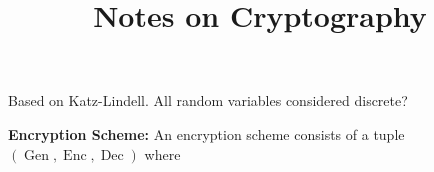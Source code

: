 \documentclass[twoside, a4paper, 10pt]{amsart}
\title[ ]{Notes on Cryptography}
\begin{document}
\maketitle
\raggedbottom


\newcommand{\cA}{\mathcal{A}}
\newcommand{\cB}{\mathcal{B}}
\newcommand{\cC}{\mathcal{C}}
\newcommand{\cD}{\mathcal{D}}
\newcommand{\cE}{\mathcal{E}}
\newcommand{\cF}{\mathcal{F}}
\newcommand{\cG}{\mathcal{G}}
\newcommand{\cH}{\mathcal{H}}
\newcommand{\cI}{\mathcal{I}}
\newcommand{\cJ}{\mathcal{J}}
\newcommand{\cK}{\mathcal{K}}
\newcommand{\cL}{\mathcal{L}}
\newcommand{\cM}{\mathcal{M}}
\newcommand{\cN}{\mathcal{N}}
\newcommand{\cO}{\mathcal{O}}
\newcommand{\cP}{\mathcal{P}}
\newcommand{\cQ}{\mathcal{Q}}
\newcommand{\cR}{\mathcal{R}}
\newcommand{\cS}{\mathcal{S}}
\newcommand{\cT}{\mathcal{T}}
\newcommand{\cU}{\mathcal{U}}
\newcommand{\cV}{\mathcal{V}}
\newcommand{\cW}{\mathcal{W}}
\newcommand{\cX}{\mathcal{X}}
\newcommand{\cY}{\mathcal{Y}}
\newcommand{\cZ}{\mathcal{Z}}
\newcommand{\bA}{\mathbb{A}}
\newcommand{\bB}{\mathbb{B}}
\newcommand{\bC}{\mathbb{C}}
\newcommand{\bD}{\mathbb{D}}
\newcommand{\bE}{\mathbb{E}}
\newcommand{\bF}{\mathbb{F}}
\newcommand{\bG}{\mathbb{G}}
\newcommand{\bH}{\mathbb{H}}
\newcommand{\bI}{\mathbb{I}}
\newcommand{\bJ}{\mathbb{J}}
\newcommand{\bK}{\mathbb{K}}
\newcommand{\bL}{\mathbb{L}}
\newcommand{\bM}{\mathbb{M}}
\newcommand{\bN}{\mathbb{N}}
\newcommand{\bO}{\mathbb{O}}
\newcommand{\bP}{\mathbb{P}}
\newcommand{\bQ}{\mathbb{Q}}
\newcommand{\bR}{\mathbb{R}}
\newcommand{\bS}{\mathbb{S}}
\newcommand{\bT}{\mathbb{T}}
\newcommand{\bU}{\mathbb{U}}
\newcommand{\bV}{\mathbb{V}}
\newcommand{\bW}{\mathbb{W}}
\newcommand{\bX}{\mathbb{X}}
\newcommand{\bY}{\mathbb{Y}}
\newcommand{\bZ}{\mathbb{Z}}


 

\theoremstyle{definition}
\newtheorem{mydef}[dummy]{Definition}
\newtheorem{prop}[dummy]{Proposition}
\newtheorem{corol}[dummy]{Corollary}
\newtheorem{thm}[dummy]{Theorem}
\newtheorem{lemma}[dummy]{Lemma}
\newtheorem{eg}[dummy]{Example}
\newtheorem{notation}[dummy]{Notation}
\newtheorem{remark}[dummy]{Remark}
\newtheorem{claim}[dummy]{Claim}
\newtheorem{Exercise}[dummy]{Exercise}
\newtheorem{question}[dummy]{Question}
\newtheorem{conjecture}[dummy]{Conjecture}


Based on Katz-Lindell. All random variables considered discrete?

\textbf{Encryption Scheme:} An encryption scheme consists of a tuple $(\operatorname{Gen}, \operatorname{Enc}, \operatorname{Dec})$ where 
\end{document}
